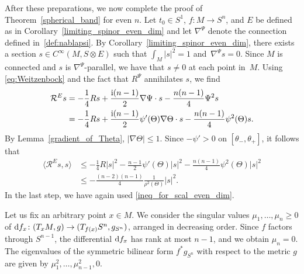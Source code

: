 \documentclass[11pt]{article}
\numberwithin{equation}{section}
\numberwithin{equation}{section}
\begin{document}
After these preparations, we now complete the proof of Theorem~\ref{spherical_band} for even $n$.
Let $t_0 \in S^1$, $f\colon M \to S^n$, and $E$ be defined as in Corollary~\ref{limiting_spinor_even_dim} and let $\nabla^\Psi$ denote the connection defined in~\eqref{def:nablapsi}.
By Corollary~\ref{limiting_spinor_even_dim}, there exists a section $s \in C^\infty(M,S \otimes E)$ such that $\int_M |s|^2 = 1$ and~${\nabla^\Psi s = 0}$.
Since $M$ is connected and $s$ is $\nabla^\Psi$-parallel, we have that $s \neq 0$ at each point in~$M$. Using \eqref{eq:Weitzenbock} and the fact that $R^\Psi$ annihilates $s$, we find
\begin{align*}
\mathcal{R}^E s
&=
-\frac{1}{4} R s + \frac{{\rm i}(n-1)}{2} \nabla \Psi \cdot s - \frac{n(n-1)}{4} \Psi^2 s \\
&=
-\frac{1}{4} R s + \frac{{\rm i}(n-1)}{2} \psi'(\Theta) \nabla\Theta \cdot s - \frac{n(n-1)}{4} \psi^2(\Theta) s .
\end{align*}
By Lemma~\ref{gradient_of_Theta}, $|\nabla \Theta| \leq 1$. Since $-\psi' > 0$ on $[\theta_-,\theta_+]$, it follows that{\samepage
\begin{align}
\big\langle \mathcal{R}^E s,s \big\rangle
&\leq
-\frac{1}{4} R |s|^2 - \frac{n-1}{2} \psi'(\Theta) |s|^2 - \frac{n(n-1)}{4} \psi^2(\Theta) |s|^2\nonumber \\
&\leq
-\frac{(n-2)(n-1)}{4} \frac{1}{\rho^2(\Theta)} |s|^2. \label{estimate_curvature_E}
\end{align}
In the last step, we have again used \eqref{ineq_for_scal_even_dim}.}

Let us fix an arbitrary point $x \in M$. We consider the singular values $\mu_1, \ldots, \mu_n \geq 0$ of ${\rm d}f_x\colon (T_x M,g) \to (T_{f(x)} S^n,g_{S^n})$, arranged in decreasing order. Since $f$ factors through $S^{n-1}$, the differential ${\rm d}f_x$ has rank at most $n-1$, and we obtain $\mu_n = 0$. The eigenvalues of the symmetric bilinear form $f^* g_{S^n}$ with respect to the metric $g$ are given by $\mu_1^2,\hdots,\mu_{n-1}^2,0$.
\end{document}
